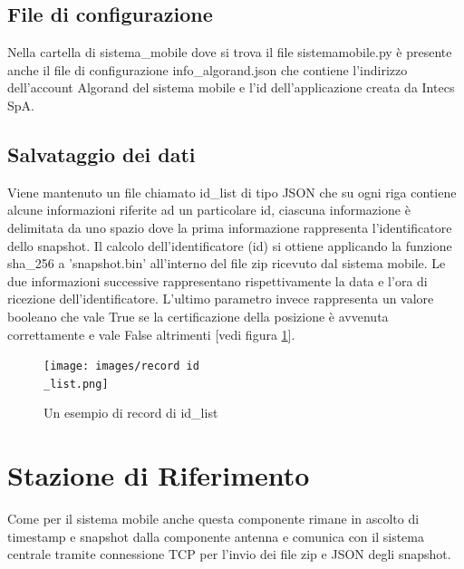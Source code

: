 \subsection{File di configurazione}
Nella cartella di sistema\_mobile dove si trova il file sistemamobile.py è presente anche il file di configurazione info\_algorand.json che contiene l'indirizzo dell'account Algorand del sistema mobile e l'id dell'applicazione creata da Intecs SpA. 


\subsection{Salvataggio dei dati}
Viene mantenuto un file chiamato id\_list di tipo JSON che su ogni riga contiene alcune informazioni riferite ad un particolare id, ciascuna informazione è delimitata da uno spazio dove la prima informazione rappresenta l'identificatore dello snapshot. Il calcolo dell'identificatore (id) si ottiene applicando la funzione sha\_256 a 'snapshot.bin' all'interno del file zip ricevuto dal sistema mobile. Le due informazioni successive rappresentano rispettivamente la data e l'ora di ricezione dell'identificatore. L'ultimo parametro invece rappresenta un valore booleano che vale True se la certificazione della posizione è avvenuta correttamente e vale False altrimenti [vedi figura \ref{fig: record_id_list }].

\begin{figure}[!h]
\centering
\texttt{[image: images/record id\\\_list.png]}
\caption{Un esempio di record di id\_list}
\label{fig: record_id_list }
\end{figure}

\section{Stazione di Riferimento}
Come per il sistema mobile anche questa componente rimane in ascolto di timestamp e snapshot dalla componente antenna e comunica con il sistema centrale tramite connessione TCP per l’invio dei file zip e JSON degli snapshot.

